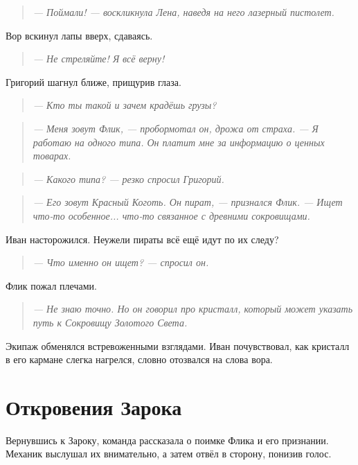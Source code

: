 \documentclass[12pt,a4paper]{book}
\newenvironment{dialogue}{\begin{quote}\itshape}{\end{quote}} %
\begin{document}
\begin{dialogue}
--- Поймали! --- воскликнула Лена, наведя на него лазерный пистолет.
\end{dialogue}

Вор вскинул лапы вверх, сдаваясь.

\begin{dialogue}
--- Не стреляйте! Я всё верну!
\end{dialogue}

Григорий шагнул ближе, прищурив глаза.

\begin{dialogue}
--- Кто ты такой и зачем крадёшь грузы?
\end{dialogue}

\begin{dialogue}
--- Меня зовут Флик, --- пробормотал он, дрожа от страха. --- Я работаю на одного типа. Он платит мне за информацию о ценных товарах.
\end{dialogue}

\begin{dialogue}
--- Какого типа? --- резко спросил Григорий.
\end{dialogue}

\begin{dialogue}
--- Его зовут Красный Коготь. Он пират, --- признался Флик. --- Ищет что-то особенное... что-то связанное с древними сокровищами.
\end{dialogue}

Иван насторожился. Неужели пираты всё ещё идут по их следу?

\begin{dialogue}
--- Что именно он ищет? --- спросил он.
\end{dialogue}

Флик пожал плечами.

\begin{dialogue}
--- Не знаю точно. Но он говорил про кристалл, который может указать путь к Сокровищу Золотого Света.
\end{dialogue}

Экипаж обменялся встревоженными взглядами. Иван почувствовал, как кристалл в его кармане слегка нагрелся, словно отозвался на слова вора.

\section*{Откровения Зарока}

Вернувшись к Зароку, команда рассказала о поимке Флика и его признании. Механик выслушал их внимательно, а затем отвёл в сторону, понизив голос.
\end{document}
